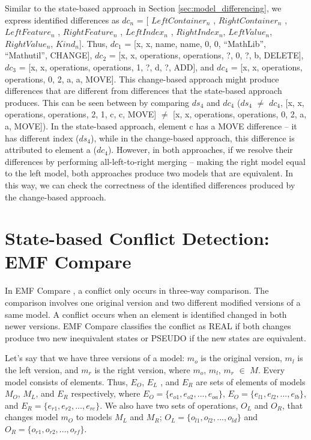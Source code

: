 Similar to the state-based approach in Section \ref{sec:model_differencing}, we express identified differences as $dc_{n}$ = [ $LeftContainer_n$ , $RightContainer_n$ , $LeftFeature_n$ , $RightFeature_n$ , $LeftIndex_n$ , $RightIndex_n$, $LeftValue_n$, $RightValue_n$, $Kind_n$]. Thus, $dc_{1}$ =  [\textsf{x}, \textsf{x}, \textsf{name}, \textsf{name}, 0, 0, ``MathLib'', ``Mathutil'', \textsf{CHANGE}], $dc_{2}$ = [\textsf{x}, \textsf{x}, \textsf{operations}, \textsf{operations}, ?, 0, ?, \textsf{b}, \textsf{DELETE}], $dc_{3}$ = [\textsf{x}, \textsf{x}, \textsf{operations}, \textsf{operations}, 1, ?, \textsf{d}, ?, \textsf{ADD}], and $dc_{4}$ = [\textsf{x}, \textsf{x}, \textsf{operations}, \textsf{operations}, 0, 2, \textsf{a}, \textsf{a}, \textsf{MOVE}]. This change-based approach might produce differences that are different from differences that the state-based approach produces. This can be seen between by comparing $ds_{4}$ and $dc_{4}$ ($ds_{4}$ $\neq$ $dc_{4}$, [\textsf{x}, \textsf{x}, \textsf{operations}, \textsf{operations}, 2, 1, \textsf{c}, \textsf{c}, \textsf{MOVE}] $\neq$ [\textsf{x}, \textsf{x}, \textsf{operations}, \textsf{operations}, 0, 2, \textsf{a}, \textsf{a}, \textsf{MOVE}]). In the state-based approach, element \textsf{c} has a \textsf{MOVE} difference -- it has different index ($ds_{4}$), while in the change-based approach, this difference is attributed to element \textsf{a} ($dc_{4}$). However, in both approaches, if we resolve their differences by performing all-left-to-right merging  -- making the right model equal to the left model, both approaches produce two models that are equivalent. In this way, we can check the correctness of the identified differences produced by the change-based approach.

\section{State-based Conflict Detection: EMF Compare}
\label{sec:state_based_conflict_detection_emf_compare}
In EMF Compare \cite{emfcompare2018developer}, a conflict only occurs in three-way comparison. The comparison involves one original version and two different modified versions of a same model. A conflict occurs when an element is identified changed in both newer versions. EMF Compare classifies the conflict as \textsf{REAL} if both changes produce two new inequivalent states or \textsf{PSEUDO} if the new states are equivalent.

Let's say that we have three versions of a model: $m_{o}$ is the original version, $m_{l}$ is the left version, and $m_{r}$ is the right version, where $m_{o}$, $m_{l}$, $m_{r}$ $\in$ $M$. 
Every model consists of elements. Thus, $E_{O}$, $E_{L}$ , and $E_{R}$ are sets of elements of models $M_{O}$, $M_{L}$, and $E_{R}$ respectively, where $E_{O}=\{e_{o1}, e_{o2}, ..., e_{oa}\}$, $E_{O}=\{e_{l1}, e_{l2}, ..., e_{lb}\}$, and $E_{R}=\{e_{r1}, e_{r2}, ..., e_{rc}\}$. 
We also have two sets of operations, $O_{L}$ and $O_{R}$, that changes model $m_{O}$ to models $M_{L}$ and $M_{R}$; $O_{L}=\{o_{l1}, o_{l2}, ..., o_{ld}\}$ and $O_{R}=\{o_{r1}, o_{r2}, ..., o_{rf}\}$. 

